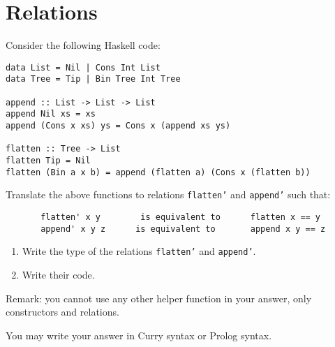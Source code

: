 \documentclass{article}
\begin{document}
\section{Relations}

Consider the following Haskell code:

\begin{verbatim}
data List = Nil | Cons Int List
data Tree = Tip | Bin Tree Int Tree 

append :: List -> List -> List
append Nil xs = xs
append (Cons x xs) ys = Cons x (append xs ys)

flatten :: Tree -> List
flatten Tip = Nil
flatten (Bin a x b) = append (flatten a) (Cons x (flatten b))
\end{verbatim}

Translate the above functions to relations \texttt{flatten'} and
\texttt{append'} such that:
\begin{verbatim}
       flatten' x y        is equivalent to      flatten x == y
       append' x y z      is equivalent to       append x y == z
\end{verbatim}

\begin{enumerate}
\item Write the type of the relations \texttt{flatten'} and
  \texttt{append'}.
\item Write their code.
\end{enumerate}

Remark: you cannot use any other helper function in your answer, only
constructors and relations.

You may write your answer in Curry syntax or Prolog syntax. 
\end{document}
